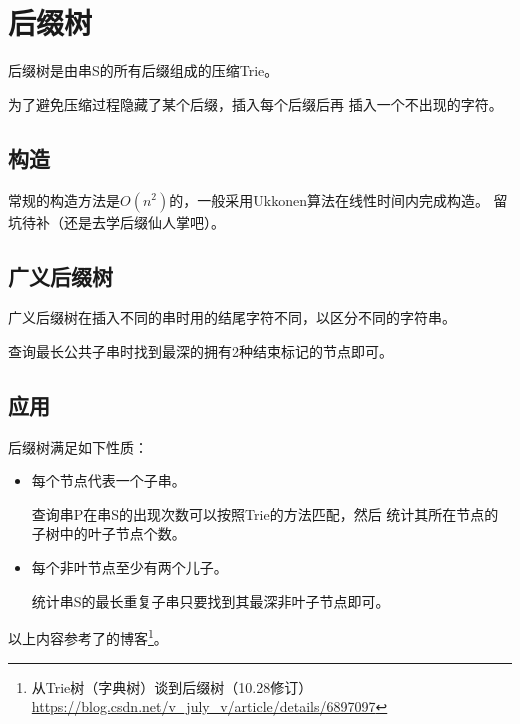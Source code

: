 \section{后缀树}
后缀树是由串S的所有后缀组成的压缩Trie。

为了避免压缩过程隐藏了某个后缀，插入每个后缀后再
插入一个不出现的字符。
\subsection{构造}
常规的构造方法是$O(n^2)$的，一般采用Ukkonen算法在线性时间内完成构造。
留坑待补（还是去学后缀仙人掌吧）。
\subsection{广义后缀树}
广义后缀树在插入不同的串时用的结尾字符不同，以区分不同的字符串。

查询最长公共子串时找到最深的拥有2种结束标记的节点即可。
\subsection{应用}
后缀树满足如下性质：
\begin{itemize}
    \item 每个节点代表一个子串。

    查询串P在串S的出现次数可以按照Trie的方法匹配，然后
    统计其所在节点的子树中的叶子节点个数。
    \item 每个非叶节点至少有两个儿子。

    统计串S的最长重复子串只要找到其最深非叶子节点即可。
\end{itemize}
以上内容参考了的博客\footnote{
	从Trie树（字典树）谈到后缀树（10.28修订）
	\url{https://blog.csdn.net/v\_july\_v/article/details/6897097}
}。
